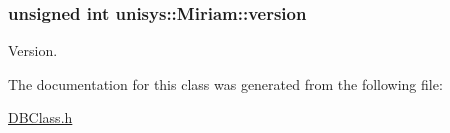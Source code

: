 \hypertarget{classunisys_1_1Miriam_a5dcb23fc55cc7643245087a941321a72}{
\subsubsection[{version}]{\setlength{\rightskip}{0pt plus 5cm}unsigned int unisys\-::\-Miriam\-::version\hspace{0.3cm}{\ttfamily [private]}}}\label{classunisys_1_1Miriam_a5dcb23fc55cc7643245087a941321a72}


Version. 



The documentation for this class was generated from the following file\-:\begin{DoxyCompactItemize}
\item 
\hyperlink{DBClass_8h}{D\-B\-Class.\-h}\end{DoxyCompactItemize}
